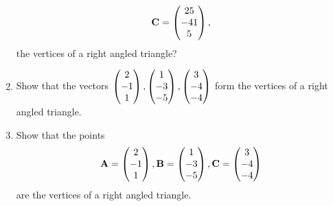 \documentclass[journal,12pt,twocolumn]{IEEEtran}
\renewcommand\thesection{\arabic{section}}
\begin{document}
\begin{enumerate}[label=\thesection.\arabic*.,ref=\thesection.\theenumi]
\begin{align}
\mathbf{C} = \begin{pmatrix}25\\ -41\\5\end{pmatrix},
\end{align}
%
the vertices of a right angled triangle?
\\
\solution
%
\item Show that the vectors 
$
\begin{pmatrix}2\\-1 \\1\end{pmatrix},
\begin{pmatrix}1\\-3 \\-5\end{pmatrix},
\begin{pmatrix}3\\ -4\\-4\end{pmatrix}
$
form the vertices of a right angled triangle.
\\
\solution
%
\item Show that the points 
\begin{align}
\mathbf{A} = \begin{pmatrix}2\\-1 \\1\end{pmatrix},
\mathbf{B} = \begin{pmatrix}1\\-3 \\-5\end{pmatrix},
\mathbf{C} = \begin{pmatrix}3\\ -4\\-4\end{pmatrix}
\end{align}
%
are the vertices of a right angled triangle.
\\
\solution
%



\end{enumerate}
\end{document}
